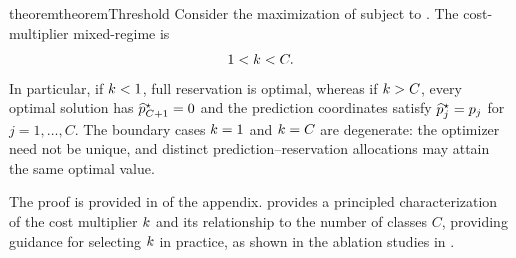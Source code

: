 \begin{restatable}{theorem}{theoremThreshold}
    \label{theorem:threshold}
    Consider the maximization of  subject to . The cost-multiplier mixed-regime is \begin{align*} 1<k<C. \end{align*} In particular, if \(k<1\), full reservation is optimal, whereas if \(k>C\), every optimal solution has \(\widehat{p}_{C+1}^\star=0\) and the prediction coordinates satisfy \(\widehat{p}_j^\star=p_j\) for \(j=1,\ldots,C\). The boundary cases \(k=1\) and \(k=C\) are degenerate: the optimizer need not be unique, and distinct prediction--reservation allocations may attain the same optimal value.
\end{restatable}
The proof is provided in  of the appendix.
 provides a principled characterization of the cost multiplier \(k\) and its relationship to the number of classes \(C\), providing guidance for selecting \(k\) in practice, as shown in the ablation studies in .
